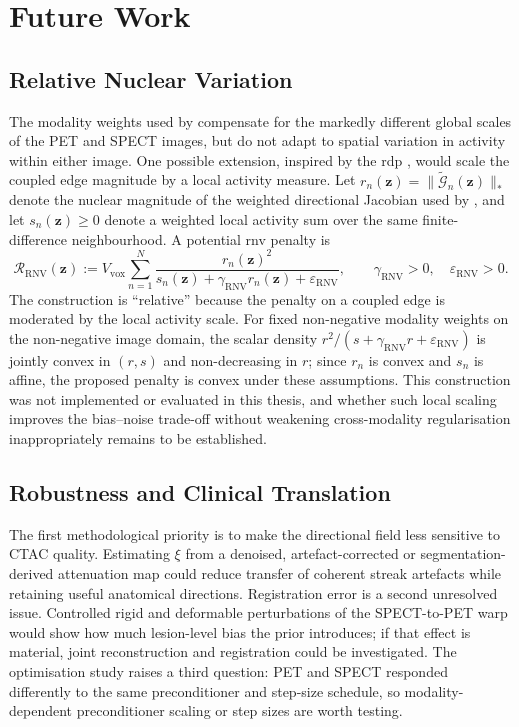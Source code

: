 \section{Future Work}
\label{sec:future_work}

\subsection{Relative Nuclear Variation}
\label{subsec:future_rnv}

The modality weights used by \wdtnv{} compensate for the markedly different global scales of the PET and SPECT images, but do not adapt to spatial variation in activity within either image. One possible extension, inspired by the \acrfull{rdp} \cite{nuytsConcavePriorPenalizing2002}, would scale the coupled edge magnitude by a local activity measure. Let $r_n(\bm{z})=\|\tilde{\mathcal{G}}_n(\bm{z})\|_*$ denote the nuclear magnitude of the weighted directional Jacobian used by \wdtnv{}, and let $s_n(\bm{z})\geq0$ denote a weighted local activity sum over the same finite-difference neighbourhood. A potential \acrfull{rnv} penalty is
\begin{equation}
    \mathcal{R}_{\mathrm{RNV}}(\bm{z})
    :=
    V_{\mathrm{vox}}
    \sum_{n=1}^{N}
    \frac{r_n(\bm{z})^2}
    {s_n(\bm{z})+\gamma_{\mathrm{RNV}}r_n(\bm{z})
        +\varepsilon_{\mathrm{RNV}}},
    \qquad
    \gamma_{\mathrm{RNV}}>0,\quad
    \varepsilon_{\mathrm{RNV}}>0.
    \label{eq:rnv_prior}
\end{equation}
The construction is ``relative'' because the penalty on a coupled edge is moderated by the local activity scale. For fixed non-negative modality weights on the non-negative image domain, the scalar density $r^2/(s+\gamma_{\mathrm{RNV}}r+\varepsilon_{\mathrm{RNV}})$ is jointly convex in $(r,s)$ and non-decreasing in $r$; since $r_n$ is convex and $s_n$ is affine, the proposed penalty is convex under these assumptions. This construction was not implemented or evaluated in this thesis, and whether such local scaling improves the bias--noise trade-off without weakening cross-modality regularisation inappropriately remains to be established.

\subsection{Robustness and Clinical Translation}
\label{subsec:future_translation}

The first methodological priority is to make the directional field less sensitive to CTAC quality. Estimating $\xi$ from a denoised, artefact-corrected or segmentation-derived attenuation map could reduce transfer of coherent streak artefacts while retaining useful anatomical directions. Registration error is a second unresolved issue. Controlled rigid and deformable perturbations of the SPECT-to-PET warp would show how much lesion-level bias the prior introduces; if that effect is material, joint reconstruction and registration could be investigated. The optimisation study raises a third question: PET and SPECT responded differently to the same preconditioner and step-size schedule, so modality-dependent preconditioner scaling or step sizes are worth testing.

